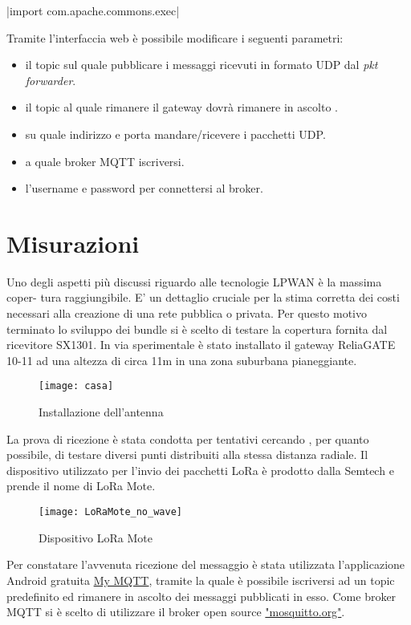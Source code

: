 |import com.apache.commons.exec|

Tramite l'interfaccia web è possibile modificare i seguenti parametri:
\begin{itemize}
\item il topic sul quale pubblicare i messaggi ricevuti in formato UDP dal
\emph{pkt forwarder}.
\item il topic al quale rimanere il gateway dovrà rimanere in ascolto .
\item su quale indirizzo e porta mandare/ricevere i pacchetti UDP.
\item a quale broker MQTT iscriversi.
\item l'username e password per connettersi al broker.
\end{itemize}


\section{Misurazioni}

Uno degli aspetti più discussi riguardo alle tecnologie LPWAN è la massima coper-
tura raggiungibile. E’ un dettaglio cruciale per la stima corretta dei costi necessari
alla creazione di una rete pubblica o privata. 
Per questo motivo terminato lo sviluppo dei bundle si è scelto di testare la
copertura fornita dal ricevitore SX1301.
In via sperimentale è stato installato  il gateway
ReliaGATE 10-11 ad una altezza di circa 11m in una zona suburbana pianeggiante.
\begin{figure}[th]
        \centering 
                \texttt{[image: casa]}
        \caption{Installazione dell'antenna}
        \label{fig:Software_stack}
\end{figure}
La prova di ricezione è stata condotta per
tentativi cercando , per quanto possibile, di testare diversi punti distribuiti
alla stessa distanza radiale. 
Il dispositivo utilizzato per l'invio dei pacchetti LoRa è prodotto dalla
Semtech e prende il nome di LoRa Mote.

\begin{figure}[th]
        \centering 
                \texttt{[image: LoRaMote\_no\_wave]}
        \caption{Dispositivo LoRa Mote}
        \label{fig:Software_stack}
\end{figure}
Per constatare l'avvenuta ricezione del
messaggio è stata utilizzata l'applicazione Android gratuita \href{
https://play.google.com/store/apps/details?id=at.tripwire.mqtt.client&hl=en}{My
MQTT}, tramite la
quale è possibile iscriversi ad un topic predefinito ed rimanere in ascolto dei
messaggi pubblicati in esso. 
Come broker MQTT si è scelto di utilizzare il
broker open source \href{http://mosquitto.org/}{"mosquitto.org"}. 
